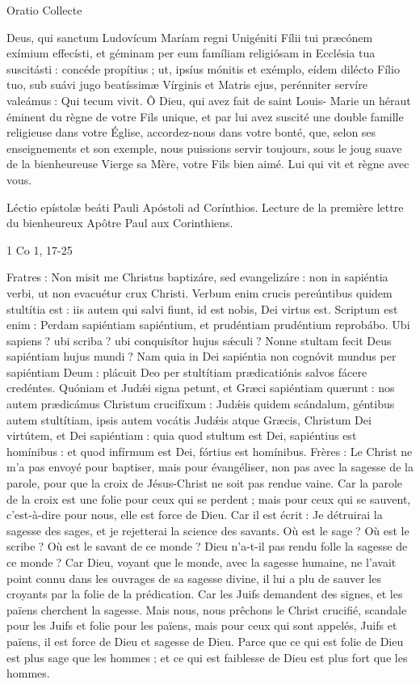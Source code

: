 \begin{paracol}{2}
Oratio
\switchcolumn
Collecte
\switchcolumn*

Deus, qui sanctum Ludovícum  Maríam regni Unigéniti Fílii tui præcónem exímium effecísti, et géminam per eum famíliam religiósam in Ecclésia tua suscitásti : concéde propítius ; ut, ipsíus mónitis et exémplo, eídem dilécto Fílio tuo, sub suávi jugo beatíssimæ Vírginis et Matris ejus, perénniter servíre valeámus : Qui tecum vivit.
\switchcolumn
Ô Dieu, qui avez fait de saint Louis- Marie un héraut éminent du règne de votre Fils unique, et par lui avez suscité une double famille religieuse dans votre Église, accordez-nous dans votre bonté, que, selon ses enseignements et son exemple, nous puissions servir toujours, sous le joug suave de la bienheureuse Vierge sa Mère, votre Fils bien aimé. Lui qui vit et règne avec vous.
\switchcolumn*

Léctio epístolæ beáti Pauli Apóstoli ad Corínthios.
\switchcolumn
Lecture de la première lettre du bienheureux Apôtre Paul aux Corinthiens.
\switchcolumn*

1 Co 1, 17-25
\switchcolumn

\switchcolumn*

Fratres : Non misit me Christus  baptizáre, sed evangelizáre : non in sapiéntia verbi, ut non evacuétur crux Christi. Verbum enim crucis pereúntibus quidem stultítia est : iis autem qui salvi fiunt, id est nobis, Dei virtus est. Scriptum est enim : Perdam sapiéntiam sapiéntium, et prudéntiam prudéntium reprobábo. Ubi sapiens ? ubi scriba ? ubi conquisítor hujus sǽculi ? Nonne stultam fecit Deus sapiéntiam hujus mundi ? Nam quia in Dei sapiéntia non cognóvit mundus per sapiéntiam Deum : plácuit Deo per stultítiam prædicatiónis salvos fácere credéntes. Quóniam et Judǽi signa petunt, et Græci sapiéntiam quærunt : nos autem prædicámus Christum crucifíxum : Judǽis quidem scándalum, géntibus autem stultítiam, ipsis autem vocátis Judǽis atque Græcis, Christum Dei virtútem, et Dei sapiéntiam : quia quod stultum est Dei, sapiéntius est homínibus : et quod infírmum est Dei, fórtius est homínibus.
\switchcolumn
Frères : Le Christ ne m’a pas envoyé pour  baptiser, mais pour évangéliser, non pas avec la sagesse de la parole, pour que la croix de Jésus-Christ ne soit pas rendue vaine. Car la parole de la croix est une folie pour ceux qui se perdent ; mais pour ceux qui se sauvent, c’est-à-dire pour nous, elle est force de Dieu. Car il est écrit : Je détruirai la sagesse des sages, et je rejetterai la science des savants. Où est le sage ? Où est le scribe ? Où est le savant de ce monde ? Dieu n’a-t-il pas rendu folle la sagesse de ce monde ? Car Dieu, voyant que le monde, avec la sagesse humaine, ne l’avait point connu dans les ouvrages de sa sagesse divine, il lui a plu de sauver les croyants par la folie de la prédication. Car les Juifs demandent des signes, et les païens cherchent la sagesse. Mais nous, nous prêchons le Christ crucifié, scandale pour les Juifs et folie pour les païens, mais pour ceux qui sont appelés, Juifs et païens, il est force de Dieu et sagesse de Dieu. Parce que ce qui est folie de Dieu est plus sage que les hommes ; et ce qui est faiblesse de Dieu est plus fort que les hommes.
\switchcolumn*


\end{paracol}
